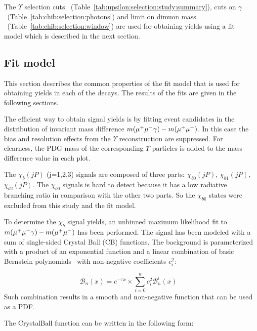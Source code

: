 

The $\Upsilon$ selection cuts
~(Table~\ref{tab:upsilon:selection:study:summary}), cuts  on $\gamma$
~(Table~\ref{tab:chib:selection:photons}) and limit on dimuon mass
~(Table~\ref{tab:chib:selection:window}) are used for obtaining \chib yields
using a fit model which is described in the next section.


\subsection{Fit model}
\label{sec:chib:fit}

This section describes the common properties of the fit model that is used for
obtaining yields in each of the \chib decays. The results of the fits are
given in the following sections.

The efficient way to obtain \chib signal yields is by fitting event candidates
in the distribution of invariant mass difference $m({\mu^+\mu^-}\gamma) - m({\mu^+\mu^-})$.
In this case the bias and resolution effects from the $\Upsilon$ reconstruction
are suppressed. For clearness, the PDG mass of the corresponding $\Upsilon$
particles is added to the mass difference value in each plot.

The $\chi_b(jP)$ (j=1,2,3) signals are composed of three parts: $\chi_{b0}(jP)$,
$\chi_{b1}(jP)$, $\chi_{b2}(jP)$. The $\chi_{b0}$ signals is hard to detect
because it has a low radiative branching ratio in comparison with the other two
parts. So the $\chi_{b0}$ states were excluded from this study and the fit
model.

To determine the $\chi_b$ signal yields, an unbinned maximum likelihood fit to
$m({\mu^+\mu^-}\gamma) - m({\mu^+\mu^-})$ has been performed. The signal has been modeled with
a sum of single-sided Crystal Ball (CB)  functions. The background is parameterized with a
product of an exponential function and a linear combination of basic Bernstein
polynomials~\cite{Phillips:2003} with non-negative coefficients $c_{i}^2$:

\begin{equation}
\label{eq:bernstein}
{\mathscr B}_{n}(x) = e^{-\tau x} \times \sum_{i=0}^{n} c_{i}^2 {\mathscr B}_{n}^{i}(x)
\end{equation}
Such combination results in a smooth and non-negative function that can be used
as a PDF.

The CrystalBall function can be written in the following form:

